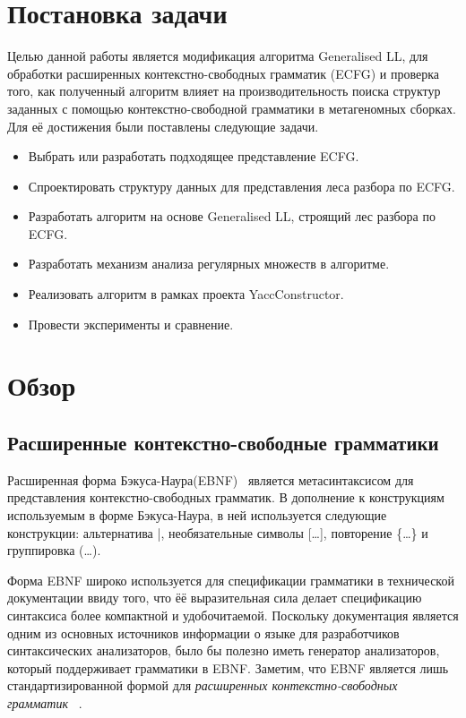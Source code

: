 \documentclass[14pt]{matmex-diploma-custom}
\begin{document}
	\section{Постановка задачи}
	
	Целью данной работы является модификация алгоритма Generalised LL, для обработки
	расширенных контекстно-свободных грамматик (ECFG) и проверка того, как полученный 
	алгоритм влияет на производительность поиска структур заданных с помощью 
	контекстно-свободной грамматики в метагеномных сборках. Для её достижения были 
	поставлены следующие задачи.
	
	\begin{itemize}  
		\item Выбрать или разработать подходящее представление ECFG.
		\item Спроектировать структуру данных для представления леса разбора по ECFG.
		\item Разработать алгоритм на основе Generalised LL, строящий лес разбора по ECFG.
        \item Разработать механизм анализа регулярных множеств в алгоритме.
		\item Реализовать алгоритм в рамках проекта YaccConstructor.
		\item Провести эксперименты и сравнение.
	\end{itemize}
	
	\section{Обзор}
	
	\subsection{Расширенные контекстно-свободные грамматики}
	
	Расширенная форма Бэкуса-Наура(EBNF)~\cite{EBNFISO} является метасинтаксисом для представления 
	контекстно-свободных грамматик. В дополнение к конструкциям используемым в форме
	Бэкуса-Наура, в ней используется следующие конструкции: альтернатива |,
	необязательные символы [\dots], повторение \{\dots\} и группировка (\dots).
	
	Форма EBNF широко используется для спецификации грамматики в технической документации
	ввиду того, что ёё выразительная сила делает спецификацию синтаксиса более компактной
	и удобочитаемой. Поскольку документация является одним из основных источников информации
	о языке для разработчиков синтаксических анализаторов, было бы полезно иметь генератор
	анализаторов, который поддерживает грамматики в EBNF. Заметим, что EBNF является 
	лишь стандартизированной формой для \textit{расширенных контекстно-свободных грамматик}
	~\cite{ECFG}.
	
\end{document}
